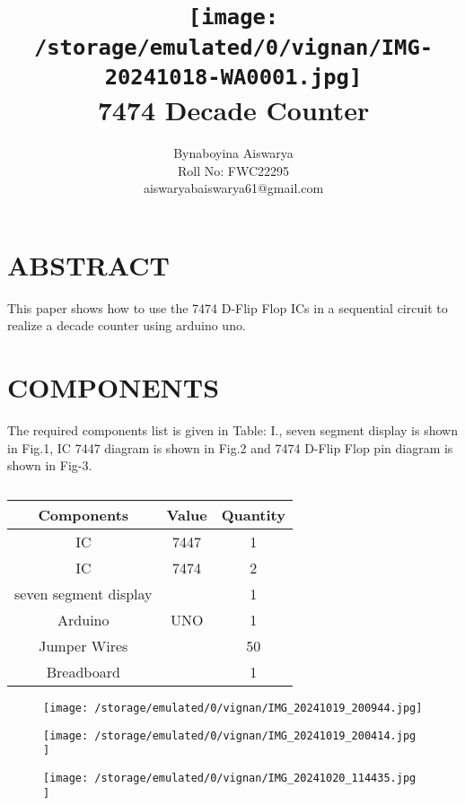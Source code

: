 \documentclass[conference]{IEEEtran}
\title{
\vspace{1cm}
{\texttt{[image:            /storage/emulated/0/vignan/IMG-20241018-WA0001.jpg]} \\ 7474 Decade Counter} }
\author{Bynaboyina Aiswarya \\ Roll No: FWC22295 \\ aiswaryabaiswarya61@gmail.com}
\begin{document}
\maketitle
 \section {ABSTRACT}
 This paper shows how to use the 7474 D-Flip Flop ICs in a sequential circuit to realize a decade counter using arduino uno.

\section{COMPONENTS}
The required components list is given in Table: I., seven segment display is shown in Fig.1, IC 7447 diagram is shown in Fig.2 and 7474 D-Flip Flop pin diagram is shown in Fig-3.
\vspace{0.3cm}
 \begin{table} [htbp]
\centering
\begin{tabular}{| c | c | c |} \hline
Components & Value & Quantity \\\hline
IC & 7447 & 1 \\ \hline
IC & 7474 & 2 \\ \hline
seven segment display & & 1\\ \hline
Arduino & UNO & 1 \\ \hline
Jumper Wires &  & 50 \\ \hline
Breadboard & & 1 \\ 
\hline
\end{tabular}
\vspace{0.3cm}
\caption{\label{tab:widgets}}
\end{table}

\begin{figure}[h]                           
\centering                                 
\texttt{[image:  /storage/emulated/0/vignan/IMG\_20241019\_200944.jpg]}                                           
\caption{\label{fig-2:Gates}}               
\end{figure}
\begin{figure}[h]                           
\centering                            
\texttt{[image:  /storage/emulated/0/vignan/IMG\_20241019\_200414.jpg ]}                      
\caption{\label{fig-1:Gates}}           
\end{figure}

\begin{figure}[h]                           
\centering                                 
\texttt{[image:   /storage/emulated/0/vignan/IMG\_20241020\_114435.jpg  ]}                                           
\caption{\label{fig-3:Gates}}               
\end{figure}
\end{document}
